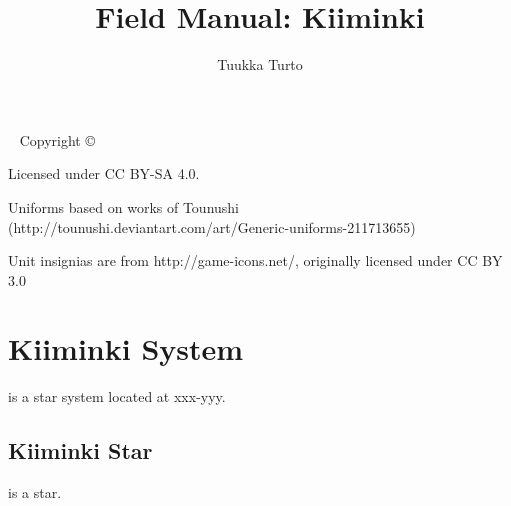 \documentclass{tufte-book}
\title{Field Manual: Kiiminki}
\author{Tuukka Turto}
\begin{document}
\frontmatter

\maketitle


\newpage
\begin{fullwidth}
~\vfill
\thispagestyle{empty}
\setlength{\parindent}{0pt}
\setlength{\parskip}{\baselineskip}
Copyright \copyright\ \the\year\ \thanklessauthor

\par Licensed under CC BY-SA 4.0.

\par Uniforms based on works of Tounushi (http://tounushi.deviantart.com/art/Generic-uniforms-211713655)

\par Unit insignias are from http://game-icons.net/, originally licensed under CC BY 3.0

\end{fullwidth}

\setcounter{tocdepth}{1}
\tableofcontents
\listoffigures
\listoftables

\mainmatter


\chapter{Kiiminki System}
\label{ch:kiiminki-system}

 is a star system located at xxx-yyy.

\section{Kiiminki Star}

 is a star.
\end{document}
